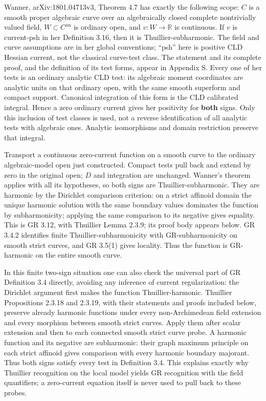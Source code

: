 \documentclass[
  10pt,
]{article}
\begin{document}
Wanner, arXiv:1801.04713v3, Theorem 4.7 has exactly the following scope:
\(C\) is a smooth proper algebraic curve over an algebraically closed
complete nontrivially valued field, \(W\subset C^{\mathrm{an}}\) is
ordinary open, and \(v:W\to\mathbb R\) is continuous. If \(v\) is
current-psh in her Definition 3.16, then it is Thuillier-subharmonic.
The field and curve assumptions are in her global conventions; ``psh''
here is positive CLD Hessian current, not the classical curve-test
class. The statement and its complete proof, and the definition of its
test forms, appear in Appendix S. Every one of her tests is an ordinary
analytic CLD test: its algebraic moment coordinates are analytic units
on that ordinary open, with the same smooth superform and compact
support. Canonical integration of this form is the CLD calibrated
integral. Hence a zero ordinary current gives her positivity for
\textbf{both} signs. Only this inclusion of test classes is used, not a
reverse identification of all analytic tests with algebraic ones.
Analytic isomorphisms and domain restriction preserve that integral.

Transport a continuous zero-current function on a smooth curve to the
ordinary algebraic-model open just constructed. Compact tests pull back
and extend by zero in the original open; \(D\) and integration are
unchanged. Wanner's theorem applies with all its hypotheses, so both
signs are Thuillier-subharmonic. They are harmonic by the Dirichlet
comparison criterion: on a strict affinoid domain the unique harmonic
solution with the same boundary values dominates the function by
subharmonicity; applying the same comparison to its negative gives
equality. This is GR 3.12, with Thuillier Lemma 2.3.9; its proof body
appears below. GR 3.4.2 identifies finite Thuillier-subharmonicity with
GR-subharmonicity on smooth strict curves, and GR 3.5(1) gives locality.
Thus the function is GR-harmonic on the entire smooth curve.

In this finite two-sign situation one can also check the universal part
of GR Definition 3.4 directly, avoiding any inference of current
regularization: the Dirichlet argument first makes the function
Thuillier-harmonic. Thuillier Propositions 2.3.18 and 2.3.19, with their
statements and proofs included below, preserve already harmonic
functions under every non-Archimedean field extension and every morphism
between smooth strict curves. Apply them after scalar extension and then
to each connected smooth strict curve probe. A harmonic function and its
negative are subharmonic: their graph maximum principle on each strict
affinoid gives comparison with every harmonic boundary majorant. Thus
both signs satisfy every test in Definition 3.4. This explains exactly
why Thuillier recognition on the local model yields GR recognition with
the field quantifiers; a zero-current equation itself is never used to
pull back to these probes.
\end{document}
